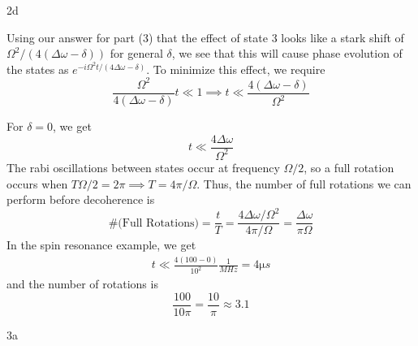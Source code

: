 \documentclass[12pt]{article}
\begin{document}
\begin{exc}{2d}

\end{exc}
\begin{ans}
Using our answer for part (3) that the effect of state 3 looks like a stark shift of $\Omega^2/(4(\Delta \omega - \delta))$ for general $\delta$, we see that this will cause phase evolution of the states as $e^{-i \Omega^2t/(4\Delta \omega - \delta)}$. To minimize this effect, we require 
\[\frac{\Omega^2}{4(\Delta \omega - \delta)}t \ll 1 \implies t \ll \frac{4(\Delta \omega - \delta)}{\Omega^2}\]

For $\delta = 0$, we get 
\[t \ll \frac{4\Delta \omega}{\Omega^2}\]
The rabi oscillations between states occur at frequency $\Omega/2$, so a full rotation occurs when $T\Omega/2 = 2\pi \implies T = 4\pi/\Omega$. Thus, the number of full rotations we can perform before decoherence is 
\[\#\textrm{(Full Rotations)} = \frac{t}{T} = \frac{4\Delta \omega / \Omega^2}{4\pi/\Omega} = \frac{\Delta \omega}{\pi\Omega}\]
In the spin resonance example, we get 
\begin{align*}
    t \ll \frac{4(100 - 0)}{10^2}\frac1{\unit{MHz}} = 4 \unit{\micro s}
\end{align*}
and the number of rotations is
\[\frac{100}{10\pi } = \frac{10}{\pi} \approx 3.1\]
\end{ans}
\newpage 
\begin{exc}{3a}

\end{exc}
\end{document}
